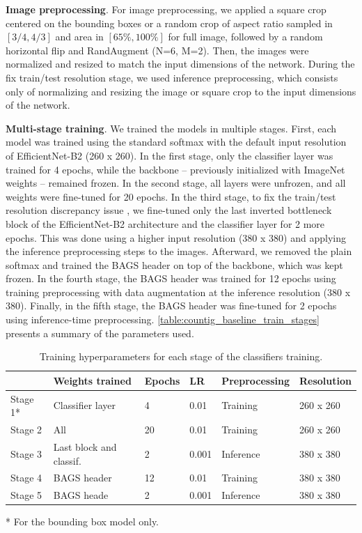 \textbf{Image preprocessing}. For image preprocessing, we applied a square crop
centered on the bounding boxes or a random crop of aspect ratio
sampled in $[3/4, 4/3]$ and area in $[65\%, 100\%]$ for full image, followed
by a random horizontal flip and RandAugment (N=6, M=2). Then, the images were
normalized and resized to match the input dimensions of the network. During the
fix train/test resolution stage, we used inference preprocessing, which consists
only of normalizing and resizing the image or square crop to the input
dimensions of the network.

\textbf{Multi-stage training}. We trained the models in multiple stages. First,
each model was trained using the standard softmax with the default input
resolution of EfficientNet-B2 (260 x 260). In the first stage, only the
classifier layer was trained for 4 epochs, while the backbone -- previously
initialized with ImageNet weights -- remained frozen. In the second stage, all
layers were unfrozen, and all weights were fine-tuned for 20 epochs. In the
third stage, to fix the train/test resolution discrepancy issue
\citep{touvron2019fixing}, we fine-tuned only the last inverted bottleneck block
of the EfficientNet-B2 architecture and the classifier layer for 2 more epochs.
This was done using a higher input resolution (380 x 380) and applying the
inference preprocessing steps to the images. Afterward, we removed the plain
softmax and trained the BAGS header on top of the backbone, which was kept
frozen. In the fourth stage, the BAGS header was trained for 12 epochs using
training preprocessing with data augmentation at the inference resolution (380 x
380). Finally, in the fifth stage, the BAGS header was fine-tuned for 2 epochs
using inference-time preprocessing.
\autoref{table:countig_baseline_train_stages} presents a summary of the
parameters used.

\begin{table}[htb]
\caption{Training hyperparameters for each stage of the classifiers training.}
\label{table:countig_baseline_train_stages}
\begin{center}
\begin{tabular}{llllll}
\hline
 & \textbf{Weights trained} & \textbf{Epochs} &
\textbf{LR} & \textbf{Preprocessing} & \textbf{Resolution} \\
\hline
Stage 1* & Classifier layer                   & 4  & 0.01  & Training  & 260 x
260 \\
Stage 2  & All                                & 20 & 0.01  & Training  & 260 x
260 \\
Stage 3  & Last block and classif. & 2  & 0.001 & Inference & 380 x
380 \\
Stage 4  & BAGS header             & 12 & 0.01  & Training  & 380 x
380 \\
Stage 5  & BAGS heade             & 2  & 0.001 & Inference & 380 x
380 \\ \hline
\end{tabular}
\begin{tablenotes}
\footnotesize
\item [*] * For the bounding box model only.
\end{tablenotes}
\end{center}
\end{table}

